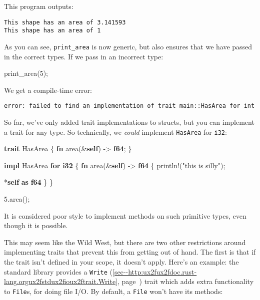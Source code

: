 \documentclass[a4paper,]{book}
\renewcommand*{\hyperref}[2][\ar]{%
  \def\ar{#2}%
  #2 (\autoref{#1}, page~\pageref{#1})}
\newenvironment{Shaded}{\begin{snugshade}}{\end{snugshade}}
\newcommand{\KeywordTok}[1]{\textcolor[rgb]{0.13,0.29,0.53}{\textbf{{#1}}}}
\newcommand{\DecValTok}[1]{\textcolor[rgb]{0.00,0.00,0.81}{{#1}}}
\newcommand{\StringTok}[1]{\textcolor[rgb]{0.31,0.60,0.02}{{#1}}}
\newcommand{\OtherTok}[1]{\textcolor[rgb]{0.56,0.35,0.01}{{#1}}}
\newcommand{\NormalTok}[1]{{#1}}
\begin{document}
This program outputs:

\begin{verbatim}
This shape has an area of 3.141593
This shape has an area of 1
\end{verbatim}

As you can see, \texttt{print\_area} is now generic, but also ensures
that we have passed in the correct types. If we pass in an incorrect
type:

\begin{Shaded}
\begin{Highlighting}[]
\NormalTok{print_area(}\DecValTok{5}\NormalTok{);}
\end{Highlighting}
\end{Shaded}

We get a compile-time error:

\begin{verbatim}
error: failed to find an implementation of trait main::HasArea for int
\end{verbatim}

So far, we've only added trait implementations to structs, but you can
implement a trait for any type. So technically, we \emph{could}
implement \texttt{HasArea} for \texttt{i32}:

\begin{Shaded}
\begin{Highlighting}[]
\KeywordTok{trait} \NormalTok{HasArea \{}
    \KeywordTok{fn} \NormalTok{area(&}\KeywordTok{self}\NormalTok{) -> }\KeywordTok{f64}\NormalTok{;}
\NormalTok{\}}

\KeywordTok{impl} \NormalTok{HasArea }\KeywordTok{for} \KeywordTok{i32} \NormalTok{\{}
    \KeywordTok{fn} \NormalTok{area(&}\KeywordTok{self}\NormalTok{) -> }\KeywordTok{f64} \NormalTok{\{}
        \OtherTok{println!}\NormalTok{(}\StringTok{"this is silly"}\NormalTok{);}

        \NormalTok{*}\KeywordTok{self} \KeywordTok{as} \KeywordTok{f64}
    \NormalTok{\}}
\NormalTok{\}}

\DecValTok{5.}\NormalTok{area();}
\end{Highlighting}
\end{Shaded}

It is considered poor style to implement methods on such primitive
types, even though it is possible.

This may seem like the Wild West, but there are two other restrictions
around implementing traits that prevent this from getting out of hand.
The first is that if the trait isn't defined in your scope, it doesn't
apply. Here's an example: the standard library provides a
\hyperref[sec--http:ux2fux2fdoc.rust-lang.orgux2fstdux2fioux2ftrait.Write]{\texttt{Write}}
trait which adds extra functionality to \texttt{File}s, for doing file
I/O. By default, a \texttt{File} won't have its methods:
\end{document}
